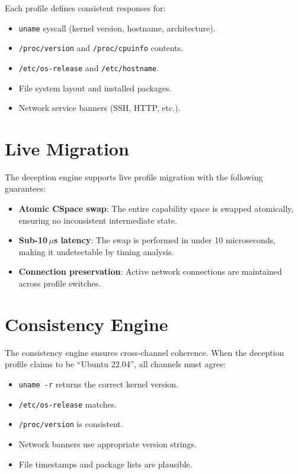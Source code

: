 \documentclass[11pt,a4paper,twoside]{report}
\theoremstyle{definition}
\begin{document}
Each profile defines consistent responses for:
\begin{itemize}[leftmargin=1.4em]
  \item \texttt{uname} syscall (kernel version, hostname, architecture).
  \item \texttt{/proc/version} and \texttt{/proc/cpuinfo} contents.
  \item \texttt{/etc/os-release} and \texttt{/etc/hostname}.
  \item File system layout and installed packages.
  \item Network service banners (SSH, HTTP, etc.).
\end{itemize}

\section{Live Migration}

The deception engine supports live profile migration with the following
guarantees:

\begin{itemize}[leftmargin=1.4em]
  \item \textbf{Atomic CSpace swap}: The entire capability space is swapped
    atomically, ensuring no inconsistent intermediate state.
  \item \textbf{Sub-10\,$\mu$s latency}: The swap is performed in under
    10 microseconds, making it undetectable by timing analysis.
  \item \textbf{Connection preservation}: Active network connections are
    maintained across profile switches.
\end{itemize}

\section{Consistency Engine}

The consistency engine ensures cross-channel coherence. When the deception
profile claims to be ``Ubuntu 22.04'', all channels must agree:

\begin{itemize}[leftmargin=1.4em]
  \item \texttt{uname -r} returns the correct kernel version.
  \item \texttt{/etc/os-release} matches.
  \item \texttt{/proc/version} is consistent.
  \item Network banners use appropriate version strings.
  \item File timestamps and package lists are plausible.
\end{itemize}
\end{document}
